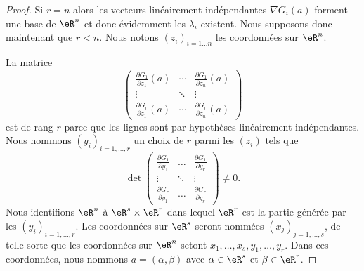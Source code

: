 \begin{proof}
	Si \( r=n\) alors les vecteurs linéairement indépendantes \( \nabla G_i(a) \) forment une base de \( \eR^n\) et donc évidemment les \( \lambda_i\) existent. Nous supposons donc maintenant que \( r<n\). Nous notons \( (z_i)_{i=1\ldots n}\) les coordonnées sur \( \eR^n\).

	La matrice
	\begin{equation}
		\begin{pmatrix}
			\frac{ \partial G_1 }{ \partial z_1 }(a) & \cdots & \frac{ \partial G_1 }{ \partial z_n }(a) \\
			\vdots                                   & \ddots & \vdots                                   \\
			\frac{ \partial G_r }{ \partial z_1 }(a) & \cdots & \frac{ \partial G_r }{ \partial z_n }(a)
		\end{pmatrix}
	\end{equation}
	est de rang \( r\) parce que les lignes sont par hypothèses linéairement indépendantes. Nous nommons \( (y_i)_{i=1,\ldots, r}\) un choix de \( r\) parmi les \( (z_i)\) tels que
	\begin{equation}
		\det\begin{pmatrix}
			\frac{ \partial G_1 }{ \partial y_1 } & \ldots & \frac{ \partial G_1 }{ \partial y_r } \\
			\vdots                                & \ddots & \vdots                                \\
			\frac{ \partial G_r }{ \partial y_1 } & \ldots & \frac{ \partial G_r }{ \partial y_r }
		\end{pmatrix}\neq 0.
	\end{equation}
	Nous identifions \( \eR^n\) à \( \eR^s\times \eR^r\) dans lequel \( \eR^r\) est la partie générée par les \( (y_i)_{i=1,\ldots, r}\). Les coordonnées sur \( \eR^s\) seront nommées \( (x_j)_{j=1,\ldots, s}\), de telle sorte que les coordonnées sur \( \eR^n\) setont \( x_1,\ldots, x_s,y_1,\ldots, y_r\). Dans ces coordonnées, nous nommons \( a=(\alpha,\beta)\) avec \( \alpha\in \eR^s\) et \( \beta\in \eR^r\).


\end{proof}
